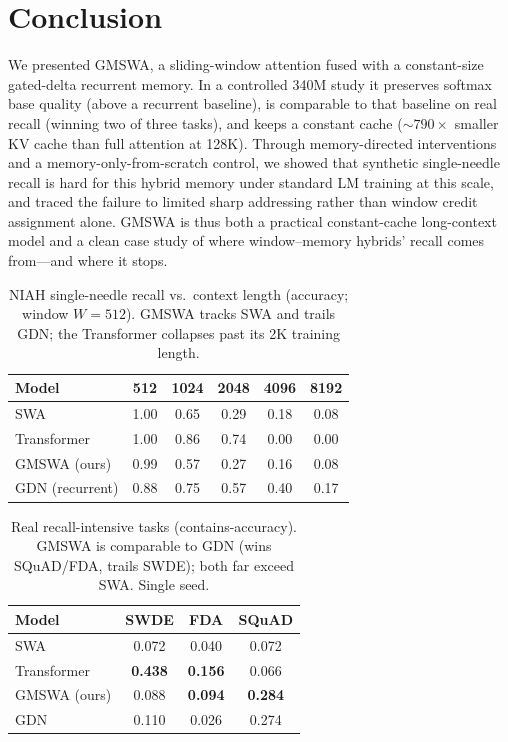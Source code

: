 \documentclass[letterpaper]{article} %
\begin{document}
\section{Conclusion}
We presented GMSWA, a sliding-window attention fused with a constant-size gated-delta recurrent memory. In a controlled 340M study it preserves softmax base quality (above a recurrent baseline), is comparable to that baseline on real recall (winning two of three tasks), and keeps a constant cache (${\sim}790\times$ smaller KV cache than full attention at 128K). Through memory-directed interventions and a memory-only-from-scratch control, we showed that synthetic single-needle recall is hard for this hybrid memory under standard LM training at this scale, and traced the failure to limited sharp addressing rather than window credit assignment alone. GMSWA is thus both a practical constant-cache long-context model and a clean case study of where window--memory hybrids' recall comes from---and where it stops.

\begin{table}[t]\centering\small
\caption{NIAH single-needle recall vs.\ context length (accuracy; window $W{=}512$). GMSWA tracks SWA and trails GDN; the Transformer collapses past its 2K training length.}
\label{tab:niah}
\begin{tabular}{lccccc}
\toprule
Model & 512 & 1024 & 2048 & 4096 & 8192 \\
\midrule
SWA & 1.00 & 0.65 & 0.29 & 0.18 & 0.08 \\
Transformer & 1.00 & 0.86 & 0.74 & 0.00 & 0.00 \\
GMSWA (ours) & 0.99 & 0.57 & 0.27 & 0.16 & 0.08 \\
GDN (recurrent) & 0.88 & 0.75 & 0.57 & 0.40 & 0.17 \\
\bottomrule
\end{tabular}
\end{table}

\begin{table}[t]\centering\small
\caption{Real recall-intensive tasks (contains-accuracy). GMSWA is comparable to GDN (wins SQuAD/FDA, trails SWDE); both far exceed SWA. Single seed.}
\label{tab:recall}
\begin{tabular}{lccc}
\toprule
Model & SWDE & FDA & SQuAD \\
\midrule
SWA & 0.072 & 0.040 & 0.072 \\
Transformer & \textbf{0.438} & \textbf{0.156} & 0.066 \\
GMSWA (ours) & 0.088 & \textbf{0.094} & \textbf{0.284} \\
GDN & 0.110 & 0.026 & 0.274 \\
\bottomrule
\end{tabular}
\end{table}
\end{document}
